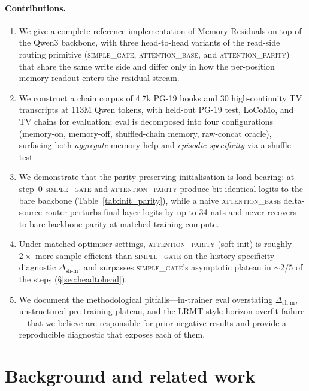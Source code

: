\documentclass{article}
\newcommand{\dsh}{\Delta_{\text{sh-m}}}
\begin{document}
\paragraph{Contributions.}
\begin{enumerate}
\item We give a complete reference implementation of Memory Residuals
on top of the Qwen3 backbone, with three head-to-head variants of the
read-side routing primitive (\textsc{simple\_gate},
\textsc{attention\_base}, and \textsc{attention\_parity}) that share
the same write side and differ only in how the per-position memory
readout enters the residual stream.
\item We construct a chain corpus of 4.7k PG-19 books and 30
high-continuity TV transcripts at 113M Qwen tokens, with held-out
PG-19 test, LoCoMo, and TV chains for evaluation; eval is decomposed
into four configurations (memory-on, memory-off, shuffled-chain
memory, raw-concat oracle), surfacing both \emph{aggregate} memory
help and \emph{episodic specificity} via a shuffle test.
\item We demonstrate that the parity-preserving initialisation is
load-bearing: at step~0 \textsc{simple\_gate} and
\textsc{attention\_parity} produce bit-identical logits to the bare
backbone (Table~\ref{tab:init_parity}), while a naive
\textsc{attention\_base} delta-source router perturbs final-layer
logits by up to 34 nats and never recovers to bare-backbone parity at
matched training compute.
\item Under matched optimiser settings, \textsc{attention\_parity}
(soft init) is roughly $2\times$ more sample-efficient than
\textsc{simple\_gate} on the history-specificity diagnostic
$\dsh$, and surpasses \textsc{simple\_gate}'s asymptotic plateau in
$\sim\!2/5$ of the steps (\S\ref{sec:headtohead}).
\item We document the methodological pitfalls---in-trainer eval
overstating $\dsh$, unstructured pre-training plateau, and the
LRMT-style horizon-overfit failure---that we believe are responsible
for prior negative results and provide a reproducible diagnostic
that exposes each of them.
\end{enumerate}

\section{Background and related work}
\label{sec:related}
\end{document}
